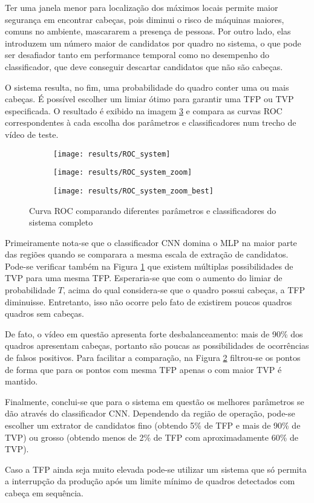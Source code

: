 Ter uma janela menor para localização dos máximos locais permite maior segurança em encontrar cabeças, pois diminui o risco de máquinas maiores, comuns no ambiente, mascararem a presença de pessoas. Por outro lado, elas introduzem um número maior de candidatos por quadro no sistema, o que pode ser desafiador tanto em performance temporal como no desempenho do classificador, que deve conseguir descartar candidatos que não são cabeças.

O sistema resulta, no fim, uma probabilidade do quadro conter uma ou mais cabeças. É possível escolher um limiar ótimo para garantir uma TFP ou TVP especificada. O resultado é exibido na imagem \ref{fig:ROC-system} e compara as curvas ROC correspondentes à cada escolha dos parâmetros e classificadores num trecho de vídeo de teste.

\begin{figure}
\centering
\begin{subfigure}{0.5\textwidth}
  \centering
  \texttt{[image: results/ROC\_system]}
  \caption{}
\end{subfigure}%
\begin{subfigure}{.5\textwidth}
  \centering
  \texttt{[image: results/ROC\_system\_zoom]}
  \caption{}
  \label{fig:ROC-system:zoom}
\end{subfigure}
\begin{subfigure}{.5\textwidth}
  \centering
  \texttt{[image: results/ROC\_system\_zoom\_best]}
  \caption{}
  \label{fig:ROC-system:zoom_best}
\end{subfigure}
\caption{Curva ROC comparando diferentes parâmetros e classificadores do sistema completo}
\label{fig:ROC-system}
\end{figure}

Primeiramente nota-se que o classificador CNN domina o MLP na maior parte das regiões quando se comparara a mesma escala de extração de candidatos. Pode-se verificar também na Figura \ref{fig:ROC-system:zoom} que existem múltiplas possibilidades de TVP para uma mesma TFP. 
Esperaria-se que com o aumento do limiar de probabilidade $T$, acima do qual considera-se que o quadro possui cabeças, a TFP diminuisse. Entretanto, isso não ocorre pelo fato de existirem poucos quadros quadros sem cabeças.

De fato, o vídeo em questão apresenta forte desbalanceamento: mais de 90\% dos quadros apresentam cabeças, portanto são poucas as possibilidades de ocorrências de falsos positivos. Para facilitar a comparação, na Figura \ref{fig:ROC-system:zoom_best} filtrou-se os pontos de forma que para os pontos com mesma TFP apenas o com maior TVP é mantido.

Finalmente, conclui-se que para o sistema em questão os melhores parâmetros se dão através do classificador CNN. Dependendo da região de operação, pode-se escolher um extrator de candidatos fino (obtendo 5\% de TFP e mais de 90\% de TVP) ou grosso (obtendo menos de 2\% de TFP com aproximadamente 60\% de TVP). 

Caso a TFP ainda seja muito elevada pode-se utilizar um sistema que só permita a interrupção da produção após um limite mínimo de quadros detectados com cabeça em sequência.



